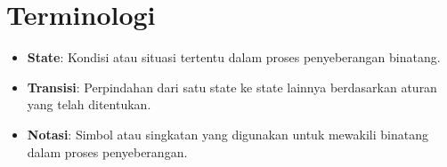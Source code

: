 \documentclass[12pt,a4paper]{article}
\begin{document}
\section*{Terminologi}
\begin{itemize}
    \item \textbf{State}: Kondisi atau situasi tertentu dalam proses penyeberangan binatang.
    \item \textbf{Transisi}: Perpindahan dari satu state ke state lainnya berdasarkan aturan yang telah ditentukan.
    \item \textbf{Notasi}: Simbol atau singkatan yang digunakan untuk mewakili binatang dalam proses penyeberangan.
\end{itemize}
\end{document}
